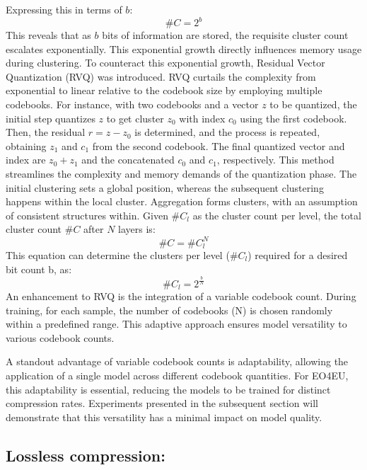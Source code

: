 \documentclass[runningheads]{llncs}
\begin{document}
Expressing this in terms of $b$:
\begin{equation}
\#C=2^b
\end{equation}
This reveals that as $b$ bits of information are stored, the requisite cluster count escalates 
exponentially. This exponential growth directly influences memory usage during clustering. To 
counteract this exponential growth, Residual Vector Quantization (RVQ) was introduced. RVQ 
curtails the complexity from exponential to linear relative to the codebook size by employing multiple 
codebooks. For instance, with two codebooks and a vector $z$ to be quantized, the initial step quantizes 
$z$  to get cluster $z_0$ with index $c_0$ using the first codebook. Then, the residual $r = z -z_0$ is determined,
and the process is repeated, obtaining $z_1$ and $c_1$ from the second codebook. The final quantized vector 
and index are $z_0 + z_1$ and the concatenated $c_0$ and $c_1$, respectively. This method streamlines the 
complexity and memory demands of the quantization phase. The initial clustering sets a global 
position, whereas the subsequent clustering happens within the local cluster. Aggregation forms 
clusters, with an assumption of consistent structures within. Given $\#C_l$ as the cluster count per level, 
the total cluster count $\#C$ after $N$ layers is:
\begin{equation}
\#C=\#C_l^N
\end{equation} 
This equation can determine the clusters per level ($\#C_l$) required for a desired bit count b, as: 
\begin{equation}
\#C_l=2^{\frac{b}{N}}
\end{equation}
An enhancement to RVQ is the integration of a variable codebook count. During training, for each 
sample, the number of codebooks (N) is chosen randomly within a predefined range. This adaptive 
approach ensures model versatility to various codebook counts. 
 
A standout advantage of variable codebook counts is adaptability, allowing the application of a single 
model across different codebook quantities. For EO4EU, this adaptability is essential, reducing the 
models to be trained for distinct compression rates. Experiments presented in the subsequent section 
will demonstrate that this versatility has a minimal impact on model quality. 

\subsection{Lossless compression:} 
 
\end{document}
